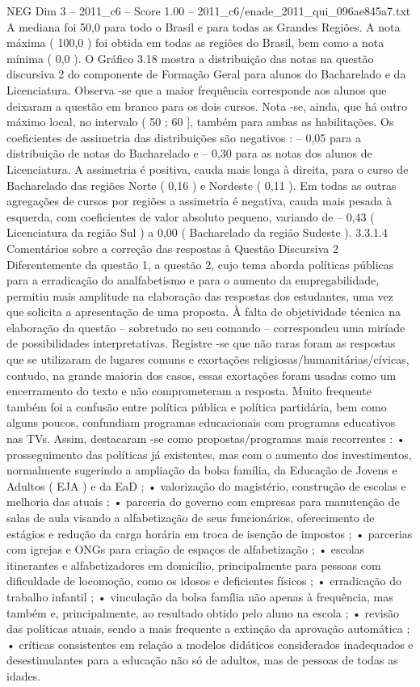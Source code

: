 \begin{textsample}{NEG Dim 3 – 2011\_c6 – Score 1.00 – 2011\_c6/enade\_2011\_qui\_096ae845a7.txt}
A mediana foi 50,0 para todo o Brasil e para todas as Grandes Regiões.
A nota máxima ( 100,0 ) foi obtida em todas as regiões do Brasil, bem como a nota mínima ( 0,0 ).
O Gráfico 3.18 mostra a distribuição das notas na questão discursiva 2 do componente de Formação Geral para alunos do Bacharelado e da Licenciatura.
Observa -se que a maior frequência corresponde aos alunos que deixaram a questão em branco para os dois cursos.
Nota -se, ainda, que há outro máximo local, no intervalo ( 50 ; 60 ], também para ambas as habilitações.
Os coeficientes de assimetria das distribuições são negativos : – 0,05 para a distribuição de notas do Bacharelado e – 0,30 para as notas dos alunos de Licenciatura.
A assimetria é positiva, cauda mais longa à direita, para o curso de Bacharelado das regiões Norte ( 0,16 ) e Nordeste ( 0,11 ).
Em todas as outras agregações de cursos por regiões a assimetria é negativa, cauda mais pesada à esquerda, com coeficientes de valor absoluto pequeno, variando de – 0,43 ( Licenciatura da região Sul ) a 0,00 ( Bacharelado da região Sudeste ). 3.3.1.4 Comentários sobre a correção das respostas à Questão Discursiva 2 Diferentemente da questão 1, a questão 2, cujo tema aborda políticas públicas para a erradicação do analfabetismo e para o aumento da empregabilidade, permitiu mais amplitude na elaboração das respostas dos estudantes, uma vez que solicita a apresentação de uma proposta.
À falta de objetividade técnica na elaboração da questão – sobretudo no seu comando – correspondeu uma miríade de possibilidades interpretativas.
Registre -se que não raras foram as respostas que se utilizaram de lugares comuns e exortações religiosas/humanitárias/cívicas, contudo, na grande maioria dos casos, essas exortações foram usadas como um encerramento do texto e não comprometeram a resposta.
Muito frequente também foi a confusão entre política pública e política partidária, bem como alguns poucos, confundiam programas educacionais com programas educativos nas TVs.
Assim, destacaram -se como propostas/programas mais recorrentes : • prosseguimento das políticas já existentes, mas com o aumento dos investimentos, normalmente sugerindo a ampliação da bolsa família, da Educação de Jovens e Adultos ( EJA ) e da EaD ; • valorização do magistério, construção de escolas e melhoria das atuais ; • parceria do governo com empresas para manutenção de salas de aula visando a alfabetização de seus funcionários, oferecimento de estágios e redução da carga horária em troca de isenção de impostos ; • parcerias com igrejas e ONGs para criação de espaços de alfabetização ; • escolas itinerantes e alfabetizadores em domicílio, principalmente para pessoas com dificuldade de locomoção, como os idosos e deficientes físicos ; • erradicação do trabalho infantil ; • vinculação da bolsa família não apenas à frequência, mas também e, principalmente, ao resultado obtido pelo aluno na escola ; • revisão das políticas atuais, sendo a mais frequente a extinção da aprovação automática ; • críticas consistentes em relação a modelos didáticos considerados inadequados e desestimulantes para a educação não só de adultos, mas de pessoas de todas as idades.

\end{textsample}
